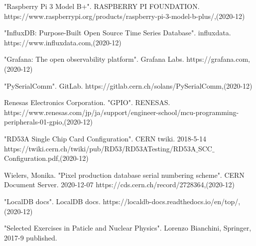 \begin{thebibliography}{9}
"Raspberry Pi 3 Model B+". RASPBERRY PI FOUNDATION. 
https://www.raspberrypi.org/products/raspberry-pi-3-model-b-plus/,(2020-12)

"InfluxDB: Purpose-Built Open Source Time Series Database". influxdata. 
https://www.influxdata.com,(2020-12)

"Grafana: The open observability platform". Grafana Labs. 
https://grafana.com,(2020-12)

"PySerialComm". GitLab. 
https://gitlab.cern.ch/solans/PySerialComm,(2020-12)

Renesas Electronics Corporation. "GPIO". RENESAS.  
https://www.renesas.com/jp/ja/support/engineer-school/mcu-programming-peripherals-01-gpio,(2020-12)

"RD53A Single Chip Card Configuration". CERN twiki. 2018-5-14 
https://twiki.cern.ch/twiki/pub/RD53/RD53ATesting/RD53A$\_$SCC$\_$Configuration.pdf,(2020-12)

Wielers, Monika. "Pixel production database serial numbering scheme". CERN Document Server. 2020-12-07
https://cds.cern.ch/record/2728364,(2020-12)

"LocalDB docs". LocalDB docs. 
https://localdb-docs.readthedocs.io/en/top/,(2020-12)

"Selected Exercises in Paticle and Nuclear Physics".
Lorenzo Bianchini, Springer, 2017-9 published.

\end{thebibliography}
